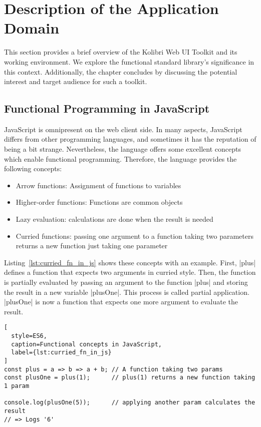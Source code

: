 \section{Description of the Application Domain}
\label{sec:Description of the Application Domain}
This section provides a brief overview of the Kolibri Web UI Toolkit and its
working environment. We explore the functional standard library's
significance in this context. Additionally, the chapter concludes by discussing
the potential interest and target audience for such a toolkit.

\subsection{Functional Programming in JavaScript}
\label{sub:Functional Programming in JavaScript}
JavaScript is omnipresent on the web client side. In many aspects, JavaScript
differs from other programming languages, and sometimes it has the reputation of
being a bit strange. Nevertheless, the language offers some excellent concepts
which enable functional programming. 
Therefore, the language provides the following concepts:

\begin{itemize}
  \item{Arrow functions: Assignment of functions to variables} 
  \item{Higher-order functions: Functions are common objects}
  \item{Lazy evaluation: calculations are done when the result is needed}
  \item{Curried functions: passing one argument to a function taking two parameters returns a new function just taking one parameter}
\end{itemize}

Listing~\ref{lst:curried_fn_in_js} shows these concepts with an example.
First, |plus| defines a function that expects two arguments in curried style.
Then, the function is partially evaluated by passing an argument to the
function |plus| and storing the result in a new variable |plusOne|. This process is called
partial application. |plusOne| is now a function that expects one more argument
to evaluate the result.

\begin{lstlisting}[
  style=ES6,
  caption=Functional concepts in JavaScript,
  label={lst:curried_fn_in_js}
]
const plus = a => b => a + b; // A function taking two params
const plusOne = plus(1);      // plus(1) returns a new function taking 1 param

console.log(plusOne(5));      // applying another param calculates the result
// => Logs '6'
\end{lstlisting}

